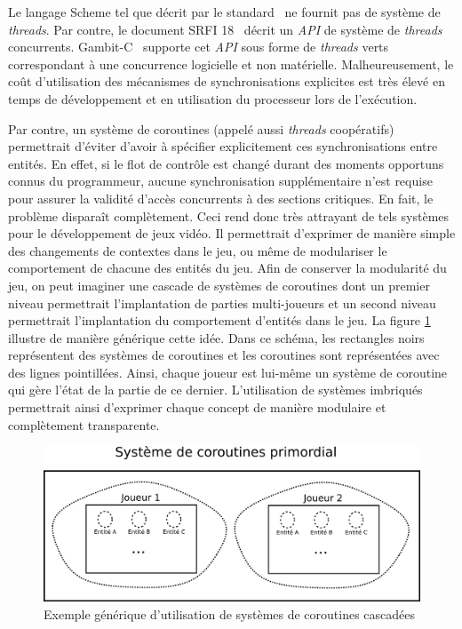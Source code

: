 \documentclass[12pt,twoside,letterpaper,francais]{book}
\begin{document}
Le langage Scheme tel que décrit par le standard~\cite{R5RS} ne
fournit pas de système de \textit{threads}. Par contre, le document
SRFI 18~\cite{SRFI18} décrit un \textit{API} de système de
\textit{threads} concurrents. Gambit-C~\cite{Gambit4} supporte cet
\textit{API} sous forme de \textit{threads} verts correspondant à une
concurrence logicielle et non matérielle. Malheureusement, le coût
d'utilisation des mécanismes de synchronisations explicites est très
élevé en temps de dévelop\-pement et en utilisation du processeur lors
de l'exécution.

Par contre, un système de coroutines (appelé aussi \textit{threads}
coopératifs) permettrait d'éviter d'avoir à spécifier explicitement
ces synchronisations entre entités. En effet, si le flot de contrôle
est changé durant des moments opportuns connus du programmeur, aucune
synchronisation supplémentaire n'est requise pour assurer la validité
d'accès concurrents à des sections critiques. En fait, le problème
disparaît complètement. Ceci rend donc très attrayant de tels systèmes
pour le dévelop\-pement de jeux vidéo. Il permettrait d'exprimer de
manière simple des changements de contextes dans le jeu, ou même de
modulariser le comportement de chacune des entités du jeu. Afin de
conserver la modularité du jeu, on peut imaginer une cascade de
systèmes de coroutines dont un premier niveau permettrait
l'implantation de parties multi-joueurs et un second niveau
permettrait l'implantation du comportement d'entités dans le jeu. La
figure \ref{Corout:usecase} illustre de manière générique cette
idée. Dans ce schéma, les rectangles noirs représentent des systèmes
de coroutines et les coroutines sont représentées avec des lignes
pointillées. Ainsi, chaque joueur est lui-même un système de coroutine
qui gère l'état de la partie de ce dernier. L'utilisation de
systèmes imbriqués permettrait ainsi d'exprimer chaque concept de
manière modulaire et complètement transparente.\\

\begin{figure}[htb!]
  \center
  \includegraphics[scale=1.2]{corout-usecase-design}
  \caption{Exemple générique d'utilisation de systèmes de coroutines
    cascadées}
  \label{Corout:usecase}
\end{figure}
\end{document}
